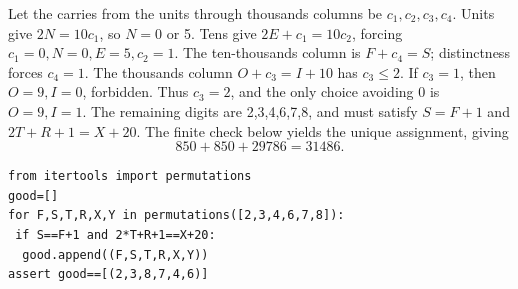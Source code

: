 Let the carries from the units through thousands columns be $ c_1,c_2,c_3,c_4 $. Units give $ 2N=10c_1 $, so $ N=0 $ or 5. Tens give $ 2E+c_1=10c_2 $, forcing $ c_1=0,N=0,E=5,c_2=1 $. The ten-thousands column is $ F+c_4=S $; distinctness forces $ c_4=1 $. The thousands column $ O+c_3=I+10 $ has $ c_3\le2 $. If $ c_3=1 $, then $ O=9,I=0 $, forbidden. Thus $ c_3=2 $, and the only choice avoiding 0 is $ O=9,I=1 $. The remaining digits are 2,3,4,6,7,8, and must satisfy $ S=F+1 $ and $ 2T+R+1=X+20 $. The finite check below yields the unique assignment, giving \[\boxed{850+850+29786=31486}.\]
\begin{verbatim}
from itertools import permutations
good=[]
for F,S,T,R,X,Y in permutations([2,3,4,6,7,8]):
 if S==F+1 and 2*T+R+1==X+20:
  good.append((F,S,T,R,X,Y))
assert good==[(2,3,8,7,4,6)]
\end{verbatim}
